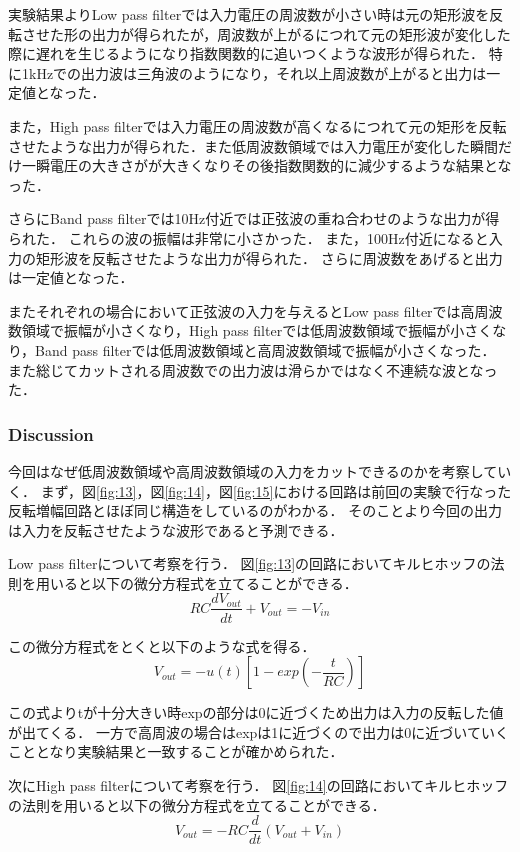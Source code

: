 \documentclass[11pt, a4paper,twocolumn]{jarticle}
\begin{document}
実験結果よりLow pass filterでは入力電圧の周波数が小さい時は元の矩形波を反転させた形の出力が得られたが，周波数が上がるにつれて元の矩形波が変化した際に遅れを生じるようになり指数関数的に追いつくような波形が得られた．
特に1kHzでの出力波は三角波のようになり，それ以上周波数が上がると出力は一定値となった．

また，High pass filterでは入力電圧の周波数が高くなるにつれて元の矩形を反転させたような出力が得られた．また低周波数領域では入力電圧が変化した瞬間だけ一瞬電圧の大きさがが大きくなりその後指数関数的に減少するような結果となった．

さらにBand pass filterでは10Hz付近では正弦波の重ね合わせのような出力が得られた．
これらの波の振幅は非常に小さかった．
また，100Hz付近になると入力の矩形波を反転させたような出力が得られた．
さらに周波数をあげると出力は一定値となった．

またそれぞれの場合において正弦波の入力を与えるとLow pass filterでは高周波数領域で振幅が小さくなり，High pass filterでは低周波数領域で振幅が小さくなり，Band pass filterでは低周波数領域と高周波数領域で振幅が小さくなった．
また総じてカットされる周波数での出力波は滑らかではなく不連続な波となった．

\subsubsection{Discussion}
今回はなぜ低周波数領域や高周波数領域の入力をカットできるのかを考察していく．
まず，図\ref{fig:13}，図\ref{fig:14}，図\ref{fig:15}における回路は前回の実験で行なった反転増幅回路とほぼ同じ構造をしているのがわかる．
そのことより今回の出力は入力を反転させたような波形であると予測できる．

Low pass filterについて考察を行う．
図\ref{fig:13}の回路においてキルヒホッフの法則を用いると以下の微分方程式を立てることができる．
\begin{equation}
    RC\frac{dV_{out}}{dt} + V_{out} = -V_{in}
\end{equation}

この微分方程式をとくと以下のような式を得る．
\begin{equation}
    V_{out} = -u(t)\left[1-exp\left(-\frac{t}{RC}\right)\right]
\end{equation}

この式よりtが十分大きい時expの部分は0に近づくため出力は入力の反転した値が出てくる．
一方で高周波の場合はexpは1に近づくので出力は0に近づいていくこととなり実験結果と一致することが確かめられた．

次にHigh pass filterについて考察を行う．
図\ref{fig:14}の回路においてキルヒホッフの法則を用いると以下の微分方程式を立てることができる．
\begin{equation}
    V_{out} = -RC\frac{d}{dt}(V_{out}+V_{in})
\end{equation}
\end{document}
